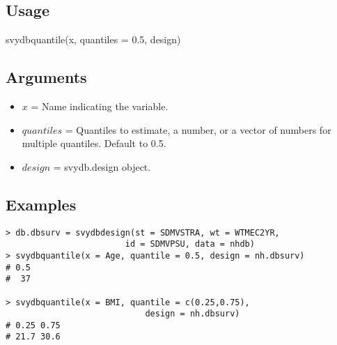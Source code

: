 \newpage

\subsection{Usage}
\begin{center}
    {\ttfamily svydbquantile(x, quantiles = 0.5, design)}
\end{center}
\subsection{Arguments}
\begin{itemize}
\item $x$ = Name indicating the variable.

\item $quantiles$ = Quantiles to estimate, a number, or a vector of numbers for multiple quantiles. Default to 0.5.

\item $design$ = svydb.design object.
\end{itemize}

\subsection{Examples}
\begin{lstlisting}
> db.dbsurv = svydbdesign(st = SDMVSTRA, wt = WTMEC2YR, 
                        id = SDMVPSU, data = nhdb)
> svydbquantile(x = Age, quantile = 0.5, design = nh.dbsurv)
# 0.5 
#  37 
 
> svydbquantile(x = BMI, quantile = c(0.25,0.75), 
                            design = nh.dbsurv)
# 0.25 0.75 
# 21.7 30.6 
\end{lstlisting}
\\
